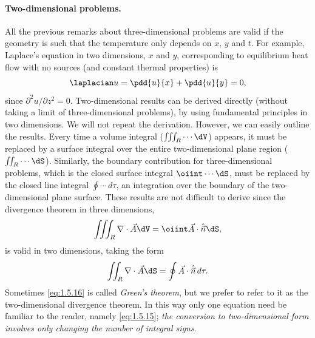 \paragraph{Two-dimensional problems.}
All the previous remarks about three-dimensional problems are valid if the geometry is such that the temperature only depends on $x$, $y$ and $t$. For example, Laplace's equation in two dimensions, $x$ and $y$, corresponding to equilibrium heat flow with no sources (and constant thermal properties) is
\[
\laplacian u = \pdd{u}{x} + \pdd{u}{y} = 0,
\]
since $\partial^2 u/\partial z^2 = 0$. Two-dimensional results can be derived directly (without taking a limit of three-dimensional problems), by using fundamental principles in two dimensions. We will not repeat the derivation. However, we can easily outline the results. Every time a volume integral ($\iiint_R \cdots\dV$) appears, it must be replaced by a surface integral over the entire two-dimensional plane region ($\iint_R \cdots\dS$). Similarly, the boundary contribution for three-dimensional problems, which is the closed surface integral $\oiint \cdots\dS$, must be replaced by the closed line integral $\oint \cdots\,d\tau$, an integration over the boundary of the two-dimensional plane surface. These results are not difficult to derive since the divergence theorem in three dimensions,
\begin{equation}
\iiint_R \nabla\cdot\vec{A}\dV = \oiint \vec{A}\cdot\hat{\vec{n}}\dS,
\label{eq:1.5.15}
\end{equation}
is valid in two dimensions, taking the form
\begin{equation}
\iint_R \nabla\cdot\vec{A}\dS = \oint \vec{A}\cdot\hat{\vec{n}}\,d\tau.
\label{eq:1.5.16}
\end{equation}
Sometimes \eqref{eq:1.5.16} is called \emph{Green's theorem}, but we prefer to refer to it as the two-dimensional divergence theorem. In this way only one equation need be familiar to the reader, namely \eqref{eq:1.5.15}; \emph{the conversion to two-dimensional form involves only changing the number of integral signs}.

